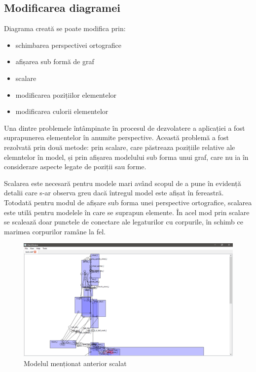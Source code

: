 \subsection{Modificarea diagramei}
Diagrama creată se poate modifica prin:
\begin{itemize}
    \item schimbarea perspectivei ortografice
    \item afișarea sub formă de graf
    \item scalare
    \item modificarea pozițiilor elementelor
    \item modificarea culorii elementelor
\end{itemize}

Una dintre problemele întâmpinate în procesul de dezvolatere a aplicației a fost suprapunerea elementelor în anumite perspective. 
Această problemă a fost rezolvată prin două metode: prin scalare, care păstreaza pozițiile relative ale elemntelor în model, și prin afișarea 
modelului sub forma unui graf, care nu ia în considerare aspecte legate de poziții sau forme.\newline


Scalarea este necesară pentru modele mari având scopul de a pune în evidență detalii care s-ar observa greu dacă întregul model este afișat în fereastră. 
Totodată pentru modul de afișare sub forma unei perspective ortografice, scalarea este utilă
pentru modelele în care se suprapun elemente. În acel mod prin scalare se scalează doar punctele de conectare ale legaturilor cu corpurile, în schimb ce marimea 
corpurilor ramâne la fel.\newline

\begin{figure}[H]
    \includegraphics[width=\linewidth]{imagini/implementare/overlappingzoom.png}
    \caption{Modelul menționat anterior scalat}
    \label{fig:tabs}
\end{figure}

